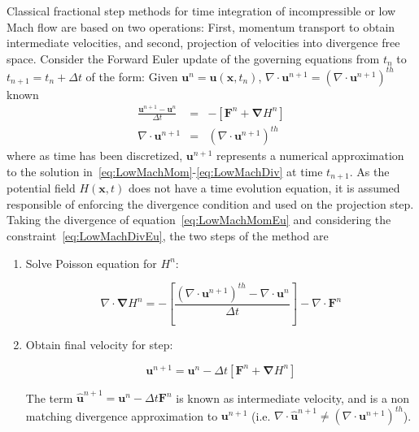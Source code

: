 \documentclass[12pt]{article}
\begin{document}
Classical fractional step methods for time integration of incompressible or low Mach flow are based on two operations: First, momentum transport to obtain intermediate velocities, and second, projection of velocities into divergence free space. Consider the Forward Euler update of the governing equations from $t_n$ to $t_{n+1}=t_n + \Delta t$ of the form: Given $ \mathbf{u}^n=\mathbf{u}(\mathbf{x},t_n)$, $\nabla \cdot \mathbf{u}^{n+1} = \left( \nabla \cdot \mathbf{u}^{n+1} \right)^{th}$ known
%
\begin{eqnarray}
  \frac{\mathbf{u}^{n+1}-\mathbf{u}^{n}}{\Delta t} &=& - \left[ \mathbf{F}^n +  \boldsymbol{\nabla} H^n \right] \label{eq:LowMachMomEu}\\
  \nabla \cdot \mathbf{u}^{n+1} &=& \left( \nabla \cdot \mathbf{u}^{n+1} \right)^{th} \label{eq:LowMachDivEu}
\end{eqnarray}
%
where as time has been discretized, $\mathbf{u}^{n+1}$ represents a numerical approximation to the solution in~\eqref{eq:LowMachMom}-\eqref{eq:LowMachDiv} at time $t_{n+1}$. As the potential field $H(\mathbf{x},t)$ does not have a time evolution equation, it is assumed responsible of enforcing the divergence condition and used on the projection step. Taking the divergence of equation~\eqref{eq:LowMachMomEu} and considering  the constraint~\eqref{eq:LowMachDivEu}, the two steps of the method are
%
\begin{enumerate}
  \item Solve Poisson equation for $H^n$:

\begin{equation}
   \nabla \cdot \boldsymbol{\nabla} H^n = - \left[ \frac{\left( \nabla \cdot \mathbf{u}^{n+1} \right)^{th} - \nabla \cdot \mathbf{u}^{n}}{\Delta t} \right] - \nabla \cdot \mathbf{F}^n \label{it:FSPoisson}
\end{equation}

  \item Obtain final velocity for step:

  \begin{equation}
     \mathbf{u}^{n+1} = \mathbf{u}^{n} - \Delta t \left[ \mathbf{F}^n +  \boldsymbol{\nabla} H^n \right] \label{it:FSProject}
   \end{equation}

   The term $\hat{\mathbf{u}}^{n+1}=\mathbf{u}^{n} - \Delta t \mathbf{F}^n$ is known as intermediate velocity, and is a non matching divergence approximation to $\mathbf{u}^{n+1}$ (i.e. $\nabla \cdot \hat{\mathbf{u}}^{n+1} \neq \left( \nabla \cdot \mathbf{u}^{n+1} \right)^{th}$).
\end{enumerate}
\end{document}
